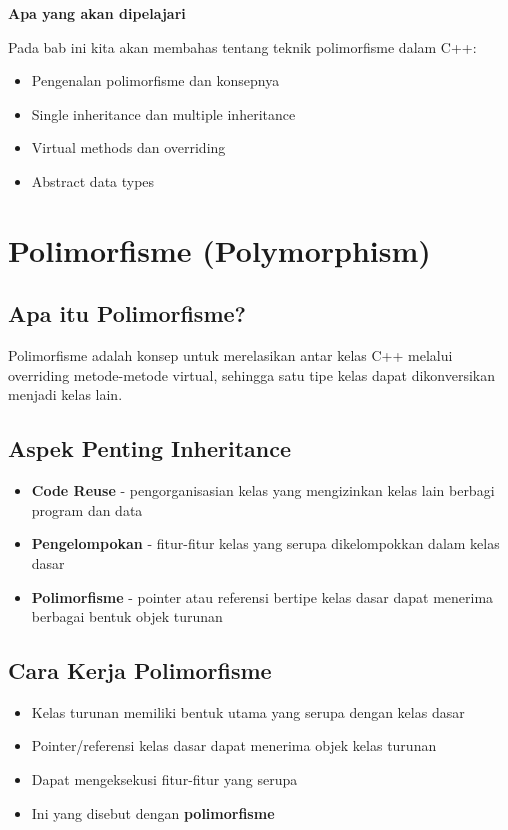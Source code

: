 \textbf{Apa yang akan dipelajari}

Pada bab ini kita akan membahas tentang teknik polimorfisme dalam C++:

\begin{itemize}
\item Pengenalan polimorfisme dan konsepnya
\item Single inheritance dan multiple inheritance
\item Virtual methods dan overriding
\item Abstract data types
\end{itemize}

\minitoc

\section{Polimorfisme (Polymorphism)}\label{sec-polymorphism}

\subsection{Apa itu Polimorfisme?}

Polimorfisme adalah konsep untuk merelasikan antar kelas C++ melalui overriding metode-metode virtual, sehingga satu tipe kelas dapat dikonversikan menjadi kelas lain.

\subsection{Aspek Penting Inheritance}

\begin{itemize}
\item \textbf{Code Reuse} - pengorganisasian kelas yang mengizinkan kelas lain berbagi program dan data
\item \textbf{Pengelompokan} - fitur-fitur kelas yang serupa dikelompokkan dalam kelas dasar
\item \textbf{Polimorfisme} - pointer atau referensi bertipe kelas dasar dapat menerima berbagai bentuk objek turunan
\end{itemize}

\subsection{Cara Kerja Polimorfisme}

\begin{itemize}
\item Kelas turunan memiliki bentuk utama yang serupa dengan kelas dasar
\item Pointer/referensi kelas dasar dapat menerima objek kelas turunan
\item Dapat mengeksekusi fitur-fitur yang serupa
\item Ini yang disebut dengan \textbf{polimorfisme}
\end{itemize}

